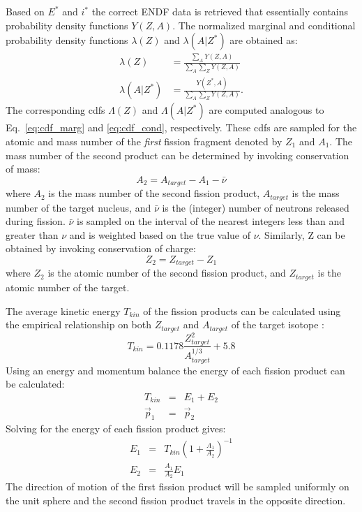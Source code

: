 \documentclass{anstrans}
\begin{document}
Based on $E^*$ and $i^*$ the correct ENDF data is retrieved that essentially contains probability density functions $Y(Z,A)$.
The normalized marginal and conditional probability density functions $\lambda(Z)$ and $\lambda(A | Z^*)$ are obtained as:
\begin{align}
   \lambda(Z) & = \frac{\sum\limits_{A} Y(Z,A)}{\sum\limits_{A}\sum\limits_{Z}  Y(Z,A)} \nonumber \\
  \lambda(A | Z^*)&= \frac{ Y(Z^*, A)}{\sum\limits_{A}\sum\limits_{Z}  Y(Z,A)}.
\end{align}
The corresponding cdfs $\Lambda(Z)$ and $\Lambda(A | Z^*)$ are computed analogous to Eq.~\eqref{eq:cdf_marg} and \eqref{eq:cdf_cond}, respectively. These cdfs are sampled
for the atomic and mass number of the {\em first} fission fragment denoted by $Z_1$ and $A_1$. 
The mass number of the second product can be determined by invoking conservation of mass:
\begin{equation}
  A_{2} = A_{target} - A_{1} - \bar \nu
\end{equation}
where $A_{2}$ is the mass number of the second fission product, $A_{target}$ is the mass number of the target nucleus, and
$\bar \nu$ is the (integer) number of neutrons released during fission. $\bar \nu$ is sampled on the interval of the nearest integers less than and greater than $\nu$ and is weighted based on the true value of $\nu$.
Similarly, Z can be obtained by invoking conservation of charge:
\begin{equation}
  Z_{2} = Z_{target} - Z_{1}
\end{equation}
where $Z_{2}$ is the atomic number of the second fission product, and $Z_{target}$ is the atomic number of the target.

The average kinetic energy $T_{kin}$ of the fission products can be calculated using the empirical relationship
on both $Z_{target}$ and $A_{target}$ of the target isotope \cite{geant}:
\begin{equation}
  T_{kin} = 0.1178 \frac{Z_{target}^2}{A_{target}^{1/3}} + 5.8
\end{equation}
Using an energy and momentum balance the energy of each fission product can be calculated: 
\begin{eqnarray}
  T_{kin} &=& E_{1} + E_{2} \\
  \vec p_{1} &=& \vec p_{2}
\end{eqnarray}
Solving for the energy of each fission product gives:
\begin{eqnarray}
  E_{1} &=& T_{kin}\left(1 +  \frac{A_{1}}{A_{2}}\right)^{-1}\\
  E_{2} &=& \frac{A_{1}}{A_{2}}E_{1}
\end{eqnarray}
The direction of motion of the first fission product will be sampled uniformly on the unit sphere and the second
fission product travels in the opposite direction.
\end{document}
